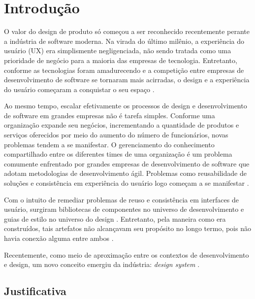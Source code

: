 
\chapter{Introdução}
\label{chap:introducao}

O valor do design de produto só começou a ser reconhecido recentemente perante a indústria de software moderna. Na virada do último milênio, a experiência do usuário (UX) era simplismente negligenciada, não sendo tratada como uma prioridade de negócio para a maioria das empresas de tecnologia. Entretanto, conforme as tecnologias foram amadurecendo e a competição entre empresas de desenvolvimento de software se tornaram mais acirradas, o design e a experiência do usuário começaram a conquistar o seu espaço \cite{ruissalo2018operating}.

Ao mesmo tempo, escalar efetivamente os processos de design e desenvolvimento de software em grandes empresas não é tarefa simples. Conforme uma organização expande seu negócios, incrementando a quantidade de produtos e serviços oferecidos por meio do aumento do número de funcionários, novas problemas tendem a se manifestar. O gerenciamento do conhecimento compartilhado entre os diferentes times de uma organização é um problema comumente enfrentado por grandes empresas de desenvolvimento de software que adotam metodologias de desenvolvimento ágil. Problemas como reusabilidade de soluções e consistência em experiência do usuário logo começam a se manifestar \cite{ruissalo2018operating}.

Com o intuito de remediar problemas de reuso e consistência em interfaces de usuário, surgiram bibliotecas de componentes no universo de desenvolvimento e guias de estilo no universo do design \cite{ruissalo2018operating}. Entretanto, pela maneira como era construídos, tais artefatos não alcançavam seu propósito no longo termo, pois não havia conexão alguma entre ambos \cite{ruissalo2018operating}.

Recentemente, como meio de aproximação entre os contextos de desenvolvimento e design, um novo conceito emergiu da indústria: \textit{design system} \cite{kholmatova2017design}.

\section{Justificativa}
\label{sec:justificativa}

